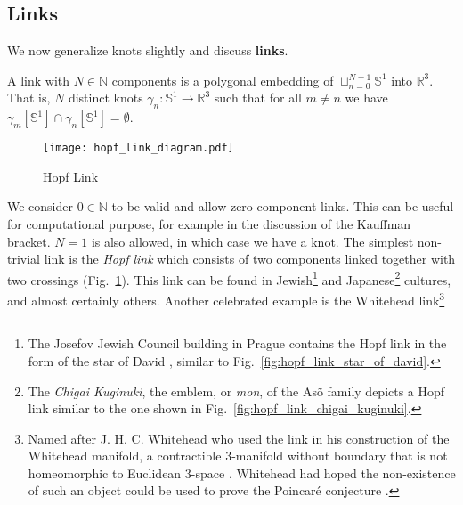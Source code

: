     \subsection{Links}
        We now generalize knots slightly and discuss \textbf{links}.
        \begin{definition}
            A link with $N\in\mathbb{N}$ components is a polygonal embedding of
            $\sqcup_{n=0}^{N-1}\mathbb{S}^{1}$ into $\mathbb{R}^{3}$.
            That is, $N$ distinct knots
            $\gamma_{n}:\mathbb{S}^{1}\rightarrow\mathbb{R}^{3}$ such that for
            all $m\ne{n}$ we have
            $\gamma_{m}[\mathbb{S}^{1}]\cap\gamma_{n}[\mathbb{S}^{1}]=\emptyset$.
        \end{definition}
        \begin{figure}
            \centering
            \texttt{[image: hopf\_link\_diagram.pdf]}
            \caption{Hopf Link}
            \label{fig:hopf_link_diagram}
        \end{figure}
        We consider $0\in\mathbb{N}$ to be valid and allow zero component links.
        This can be useful for computational purpose, for example in the
        discussion of the Kauffman bracket. $N=1$ is also allowed, in which
        case we have a knot. The simplest non-trivial link is the
        \textit{Hopf link} which consists of two components linked together
        with two crossings (Fig.~\ref{fig:hopf_link_diagram}).
        This link can be found in Jewish\footnote{%
            The Josefov Jewish Council building in Prague contains the
            Hopf link in the form of the star of David \cite{KatlasHopfLink},
            similar to Fig.~\ref{fig:hopf_link_star_of_david}.
        }
        and Japanese\footnote{%
            The \textit{Chigai Kuginuki}, the emblem, or \textit{mon},
            of the As\~{o} family depicts a Hopf link \cite{KatlasHopfLink}
            similar to the one shown in Fig.~\ref{fig:hopf_link_chigai_kuginuki}.
        }
        cultures, and almost certainly others. Another celebrated example is
        the Whitehead link\footnote{%
            Named after J. H. C. Whitehead who used the link in his
            construction of the Whitehead
            manifold, a contractible 3-manifold without boundary that is not
            homeomorphic to Euclidean 3-space \cite{WhiteheadManifold}.
            Whitehead had hoped the non-existence of such an object could be
            used to prove the Poincar\'{e} conjecture
            \cite{WhiteheadPoincareConjecture}.
        }
